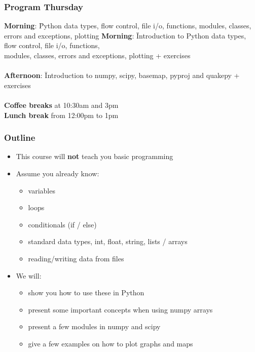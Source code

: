 \begin{frame}[fragile]
\frametitle{Program Thursday}
\begin{tabbing}
\textbf{Morning}: \= Python data types, flow control, file i/o, functions,
modules, classes, errors and exceptions, plotting \kill
\textbf{Morning}: \= Introduction to Python data types, flow control, file i/o,
functions,\\
 modules, classes, errors and exceptions, plotting + exercises \\
\\
\textbf{Afternoon}: \= Introduction to numpy, scipy, basemap, pyproj and quakepy
+ exercises
\\
\\ 
\textbf{Coffee breaks} at 10:30am and 3pm\\
\textbf{Lunch break} from 12:00pm to 1pm\\
\end{tabbing}
\end{frame}

\begin{frame}[fragile]
    \frametitle{Outline}
    \begin{itemize}
        \item This course will \textbf{not} teach you basic programming
        \item Assume you already know:
        \begin{itemize}
            \item variables
            \item loops
            \item conditionals (if / else)
            \item standard data types, int, float, string, lists / arrays
            \item reading/writing data from files
        \end{itemize}
        \item We will:
        	\begin{itemize}
        	  \item show you how to use these in Python 
		      \item present some important concepts when using numpy arrays
		      \item present a few modules in numpy and scipy
		      \item give a few examples on how to plot graphs and maps
        	\end{itemize} 
    \end{itemize}
\end{frame}

